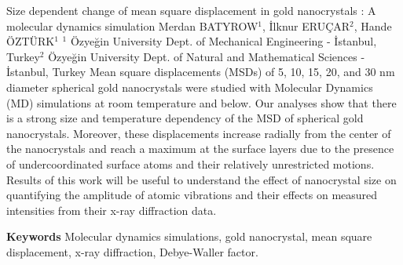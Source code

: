 
    \begin{abstract_online}{Size dependent change of mean square displacement in gold nanocrystals : A molecular dynamics simulation}{%
        Merdan BATYROW$^{1}$, İlknur ERUÇAR$^{2}$, Hande ÖZTÜRK$^{1}$}{%
        }{%
        $^1$ Özyeğin University Dept. of Mechanical Engineering - İstanbul, Turkey\newline{}$^2$ Özyeğin University Dept. of Natural and Mathematical Sciences - İstanbul, Turkey}
    Mean square displacements (MSDs) of 5, 10, 15, 20, and 30 nm diameter spherical gold nanocrystals were studied with Molecular Dynamics (MD) simulations at room temperature and below. Our analyses show that there is a strong size and temperature dependency of the MSD of spherical gold nanocrystals. Moreover, these displacements increase radially from the center of the nanocrystals and reach a maximum at the surface layers due to the presence of undercoordinated surface atoms and their relatively unrestricted motions. Results of this work will be useful to understand the effect of nanocrystal size on quantifying the amplitude of atomic vibrations and their effects on measured intensities from their x-ray diffraction data. 
    
        \textbf{Keywords} \newline{}Molecular dynamics simulations, gold nanocrystal, mean square displacement, x-ray diffraction, Debye-Waller factor.
    \end{abstract_online}
    